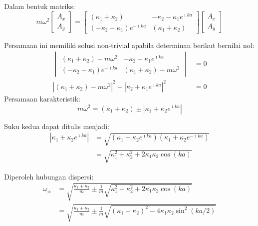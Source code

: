 Dalam bentuk matriks:
\begin{equation*}
m\omega^2 \begin{bmatrix}
A_{x} \\
A_{y}
\end{bmatrix} = 
\begin{bmatrix}
(\kappa_{1} + \kappa_{2}) & -\kappa_{2} - \kappa_{1} e^{\imath k a} \\
(-\kappa_{2} - \kappa_{1})e^{-\imath k a} & (\kappa_{1} + \kappa_{2})
\end{bmatrix}
\begin{bmatrix}
A_{x} \\
A_{y}
\end{bmatrix}    
\end{equation*}

Persamaan ini memiliki solusi non-trivial apabila determinan berikut
bernilai nol:
\begin{align*}
\begin{vmatrix}
(\kappa_{1} + \kappa_{2}) - m\omega^2 & -\kappa_{2} - \kappa_{1} e^{\imath k a} \\
(-\kappa_{2} - \kappa_{1})e^{-\imath k a} & (\kappa_{1} + \kappa_{2}) - m\omega^2
\end{vmatrix} & = 0 \\
\left| (\kappa_{1} + \kappa_{2}) - m\omega^2 \right|^2 -
\left| \kappa_{2} + \kappa_{1}e^{\imath k a} \right|^2 & = 0
\end{align*}
Persamaan karakteristik:
\begin{equation*}
m\omega^2 = (\kappa_{1} + \kappa_{2}) \pm 
\left| \kappa_{1} + \kappa_{2} e^{\imath k a}\right|    
\end{equation*}

Suku kedua dapat ditulis menjadi:
\begin{align}
\left| \kappa_{1} + \kappa_{2} e^{\imath ka} \right| & = 
\sqrt{( \kappa_{1} + \kappa_{2} e^{\imath ka} )
  ( \kappa_{1} + \kappa_{2} e^{-\imath ka} ) } \\
& = \sqrt{ \kappa_{1}^{2} + \kappa_{2}^{2} + 2\kappa_{1} \kappa_{2} \cos(ka) }
\end{align}

Diperoleh hubungan dispersi:
\begin{align}
\omega_{\pm} & = \sqrt{\frac{\kappa_{1} + \kappa_{2}}{m} \pm
\frac{1}{m}\sqrt{ \kappa_{1}^{2} + \kappa_{2}^{2} + 2\kappa_{1} \kappa_{2} \cos(ka) }
} \\
& = \sqrt{\frac{\kappa_{1} + \kappa_{2}}{m} \pm
\frac{1}{m}\sqrt{ (\kappa_{1} + \kappa_{2})^{2} - 4\kappa_{1} \kappa_{2} \sin^{2}(ka/2) }
}
\end{align}

